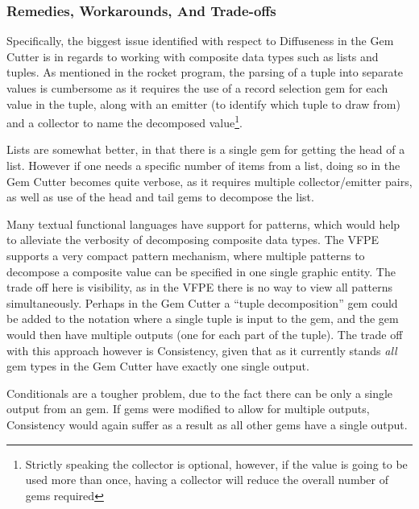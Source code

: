 
\subsubsection{Remedies, Workarounds, And Trade-offs}

Specifically, the biggest issue identified with respect to Diffuseness in the Gem Cutter is in regards to working with composite data types such as lists and tuples.  As mentioned in the rocket program, the parsing of a tuple into separate values is cumbersome as it requires the use of a record selection gem for each value in the tuple, along with an emitter (to identify which tuple to draw from) and a collector to name the decomposed value\footnote{Strictly speaking the collector is optional, however, if the value is going to be used more than once, having a collector will reduce the overall number of gems required}.  

Lists are somewhat better, in that there is a single gem for getting the head of a list.  However if one needs a specific number of items from a list, doing so in the Gem Cutter becomes quite verbose, as it requires multiple collector/emitter pairs, as well as use of the head and tail gems to decompose the list.

Many textual functional languages have support for patterns, which would help to alleviate the verbosity of decomposing composite data types.  The VFPE supports a very compact pattern mechanism, where multiple patterns to decompose a composite value can be specified in one single graphic entity. The trade off here is visibility, as in the VFPE there is no way to view all patterns simultaneously.  Perhaps in the Gem Cutter a ``tuple decomposition'' gem could be added to the notation where a single tuple is input to the gem, and the gem would then have multiple outputs (one for each part of the tuple).  The trade off with this approach however is Consistency, given that as it currently stands \emph{all} gem types in the Gem Cutter have exactly one single output.

Conditionals are a tougher problem, due to the fact there can be only a single output from an  gem.  If  gems were modified to allow for multiple outputs, Consistency would again suffer as a result as all other gems have a single output.


